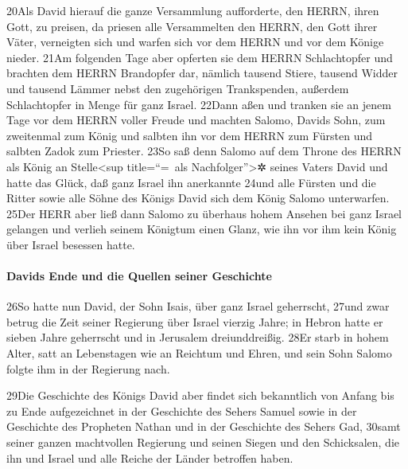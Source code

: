 20Als David hierauf die ganze Versammlung aufforderte, den HERRN, ihren
Gott, zu preisen, da priesen alle Versammelten den HERRN, den Gott ihrer
Väter, verneigten sich und warfen sich vor dem HERRN und vor dem Könige
nieder. 21Am folgenden Tage aber opferten sie dem HERRN Schlachtopfer
und brachten dem HERRN Brandopfer dar, nämlich tausend Stiere, tausend
Widder und tausend Lämmer nebst den zugehörigen Trankspenden, außerdem
Schlachtopfer in Menge für ganz Israel. 22Dann aßen und tranken sie an
jenem Tage vor dem HERRN voller Freude und machten Salomo, Davids Sohn,
zum zweitenmal zum König und salbten ihn vor dem HERRN zum Fürsten und
salbten Zadok zum Priester. 23So saß denn Salomo auf dem Throne des
HERRN als König an Stelle\textless sup title=``=~als
Nachfolger''\textgreater✲ seines Vaters David und hatte das Glück, daß
ganz Israel ihn anerkannte 24und alle Fürsten und die Ritter sowie alle
Söhne des Königs David sich dem König Salomo unterwarfen. 25Der HERR
aber ließ dann Salomo zu überhaus hohem Ansehen bei ganz Israel gelangen
und verlieh seinem Königtum einen Glanz, wie ihn vor ihm kein König über
Israel besessen hatte.

\hypertarget{davids-ende-und-die-quellen-seiner-geschichte}{%
\paragraph{Davids Ende und die Quellen seiner
Geschichte}\label{davids-ende-und-die-quellen-seiner-geschichte}}

26So hatte nun David, der Sohn Isais, über ganz Israel geherrscht, 27und
zwar betrug die Zeit seiner Regierung über Israel vierzig Jahre; in
Hebron hatte er sieben Jahre geherrscht und in Jerusalem dreiunddreißig.
28Er starb in hohem Alter, satt an Lebenstagen wie an Reichtum und
Ehren, und sein Sohn Salomo folgte ihm in der Regierung nach.

29Die Geschichte des Königs David aber findet sich bekanntlich von
Anfang bis zu Ende aufgezeichnet in der Geschichte des Sehers Samuel
sowie in der Geschichte des Propheten Nathan und in der Geschichte des
Sehers Gad, 30samt seiner ganzen machtvollen Regierung und seinen Siegen
und den Schicksalen, die ihn und Israel und alle Reiche der Länder
betroffen haben.
